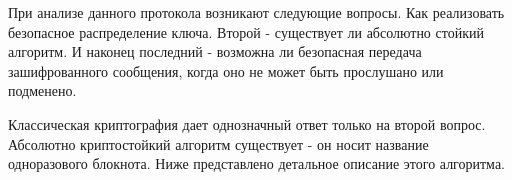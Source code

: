 При анализе данного протокола возникают следующие вопросы. Как
реализовать безопасное распределение ключа. Второй - существует ли
абсолютно стойкий алгоритм. И наконец последний - возможна ли
безопасная передача зашифрованного сообщения, когда оно не может быть
прослушано или подменено. 

Классическая криптография дает однозначный ответ только на второй
вопрос. Абсолютно криптостойкий алгоритм существует - он носит название
одноразового блокнота. Ниже представлено детальное описание этого алгоритма.
